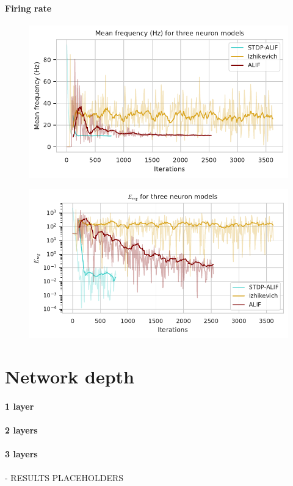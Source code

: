 	\paragraph{Firing rate}
		\begin{figure}[ht]
			\centering
		    \includegraphics{gfx/hz}
		    \label{fig:hz}
		    \caption{}
		\end{figure}
		\begin{figure}[ht]
			\centering
		    \includegraphics{gfx/regerr}
		    \label{fig:regerr}
		    \caption{}
		\end{figure}

\section{Network depth}

	\paragraph{1 layer}

	\paragraph{2 layers}

	\paragraph{3 layers}

\begin{tcolorbox}[colback=orange]
- RESULTS PLACEHOLDERS

\end{tcolorbox}
